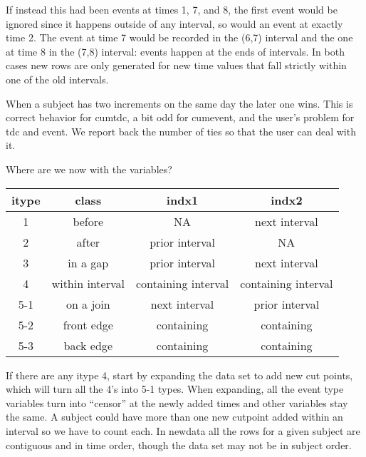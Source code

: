\documentclass{article}
\begin{document}
If instead this had been events at times 1, 7, and 8, the first event would
be ignored since it happens outside of any interval, so would an event
at exactly time 2.  The event at time
7 would be recorded in the (6,7) interval and the one at time 8 in the 
(7,8) interval: events happen at the ends of intervals.
In both cases new rows are only generated for new time values that fall
strictly within one of the old intervals.

When a subject has two increments on the same day the later one wins.
This is correct behavior for cumtdc, a bit odd for cumevent, and the
user's problem for tdc and event.
We report back the number of ties so that the user can deal with it. 

Where are we now with the variables?
\begin{center}
  \begin{tabular}{cccc}
    itype& class &   indx1 & indx2 \\ \hline
    1    & before       &   NA & next interval \\
    2    & after        & prior interval & NA \\
    3    & in a gap     & prior interval & next interval \\ 
    4    & within interval & containing interval & containing interval \\
    5-1  & on a join    & next interval & prior interval \\
    5-2  & front edge   & containing & containing \\
    5-3  & back edge    & containing & containing \\
    \end{tabular}
\end{center}
If there are any itype 4, start by expanding the data set to add
new cut points, which will turn all the 4's into 5-1 types.
When expanding, all the event type variables turn into ``censor'' at the
newly added times and other variables stay the same.
A subject could have more than one new cutpoint added within an interval
so we have to count each.
In newdata all the rows for a given subject are contiguous and in time
order, though the data set may not be in subject order.
\end{document}
